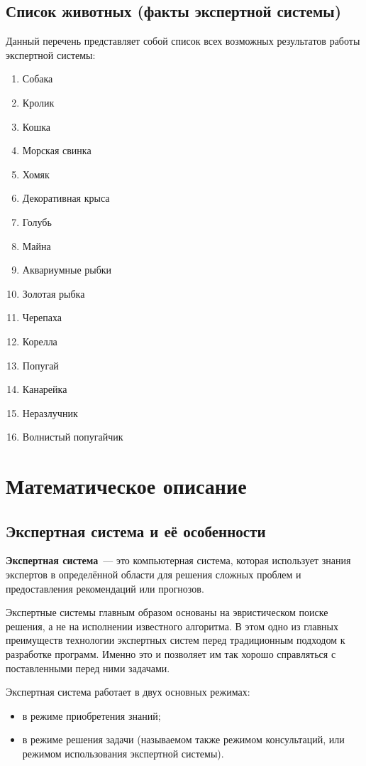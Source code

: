 \documentclass[a4paper,final]{article}
\begin{document}
\subsection*{Список животных (факты экспертной системы)}

Данный перечень представляет собой список всех возможных результатов работы экспертной системы:

\begin{enumerate}
	\item Собака
	\item Кролик
	\item Кошка
	\item Морская свинка
	\item Хомяк
	\item Декоративная крыса
	\item Голубь
	\item Майна
	\item Аквариумные рыбки
	\item Золотая рыбка
	\item Черепаха
	\item Корелла
	\item Попугай
	\item Канарейка
	\item Неразлучник
	\item Волнистый попугайчик
\end{enumerate}


\newpage
\section{Математическое описание}

\subsection{Экспертная система и её особенности}

\textbf{Экспертная система}~--- это компьютерная система, которая использует знания экспертов в определённой области для решения сложных проблем и предоставления рекомендаций или прогнозов.

Экспертные системы главным образом основаны на эвристическом поиске решения, а не на исполнении известного алгоритма. В этом одно из главных преимуществ технологии экспертных систем перед традиционным подходом к разработке программ. Именно это и позволяет им так хорошо справляться с поставленными перед ними задачами.

Экспертная система работает в двух основных режимах:
\begin{itemize}
	\item в режиме приобретения знаний;
	\item в режиме решения задачи (называемом также режимом консультаций, или режимом использования экспертной системы).
\end{itemize}
\end{document}
